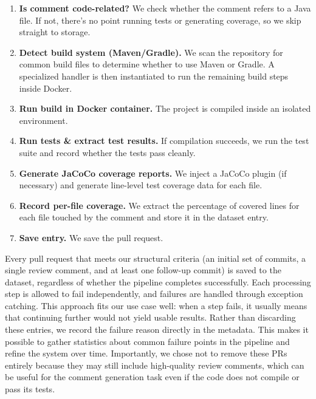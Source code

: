 \begin{enumerate}
    \item \textbf{Is comment code-related?} We check whether the comment refers to a Java file. If
        not, there's no point running tests or generating coverage, so we skip straight to storage.

    \item \textbf{Detect build system (Maven/Gradle).} We scan the repository for common build files
        to determine whether to use Maven or Gradle. A specialized handler is then instantiated to
        run the remaining build steps inside Docker.

    \item \textbf{Run build in Docker container.} The project is compiled inside an isolated
        environment.

    \item \textbf{Run tests \& extract test results.} If compilation succeeds, we run the test suite
        and record whether the tests pass cleanly.

    \item \textbf{Generate JaCoCo coverage reports.} We inject a JaCoCo plugin (if necessary) and
        generate line-level test coverage data for each file.

    \item \textbf{Record per-file coverage.} We extract the percentage of covered lines for each
        file touched by the comment and store it in the dataset entry.

    \item \textbf{Save entry.} We save the pull request.
\end{enumerate}

Every pull request that meets our structural criteria (an initial set of commits, a single review
comment, and at least one follow-up commit) is saved to the dataset, regardless of whether the
pipeline completes successfully. Each processing step is allowed to fail independently, and failures
are handled through exception catching. This approach fits our use case well: when a step fails, it
usually means that continuing further would not yield usable results. Rather than discarding these
entries, we record the failure reason directly in the metadata. This makes it possible to gather
statistics about common failure points in the pipeline and refine the system over time. Importantly,
we chose not to remove these PRs entirely because they may still include high-quality review
comments, which can be useful for the comment generation task even if the code does not compile or
pass its tests.


